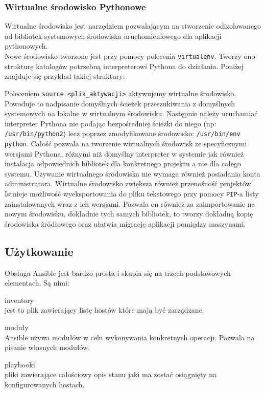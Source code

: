 \subsubsection{Wirtualne środowisko Pythonowe}
Wirtualne środowisko jest narzędziem pozwalającym na stworzenie odizolowanego od bibliotek systemowych środowiska uruchomieniowego dla aplikacji pythonowych.\\
Nowe środowisko tworzone jest przy pomocy polecenia \texttt{virtualenv}.
Tworzy ono strukturę katalogów potrzebną interpreterowi Pythona do działania. Poniżej znajduje się przykład takiej struktury:

Poleceniem \texttt{source <plik\_aktywacji>} aktywujemy wirtualne środowisko.
Powoduje to nadpisanie domyślnych ścieżek przeszukiwania z domyślnych systemowych na lokalne w wirtualnym środowisku.
Następnie należy uruchamiać interpreter Pythona nie podając bezpośredniej ścieżki do niego (np: \texttt{/usr/bin/python2}) lecz poprzez zmodyfikowane środowisko: \texttt{/usr/bin/env python}.
Całość pozwala na tworzenie wirtualnych środowisk ze specyficznymi wersjami Pythona, różnymi niż domyślny interpreter w systemie jak również instalacja odpowiednich bibliotek dla konkretnego projektu a nie dla całego systemu.
Używanie wirtualnego środowiska nie wymaga również posiadania konta administratora.  
Wirtualne środowisko zwiększa również przenośność projektów.
Istnieje możliwość wyeksportowania do pliku tekstowego przy pomocy \texttt{PIP}-a listy zainstalowanych wraz z ich wersjami.
Pozwala on również za zaimportowanie na nowym środowisku, dokładnie tych samych bibliotek, to tworzy dokładną kopię środowiska źródłowego oraz ułatwia migrację aplikacji pomiędzy maszynami.
\subsection{Użytkowanie}
Obsługa Ansible jest bardzo prosta i skupia się na trzech podstawowych elementach. Są nimi:
\begin{description}
\item {inventory}\\jest to plik zawierający listę hostów które mają być zarządzane.
\item {moduły}\\Ansible używa modułów w celu wykonywania konkretnych operacji. Pozwala na pisanie własnych modułów.
\item {playbooki}\\pliki zawierające całościowy opis stanu jaki ma zostać osiągnięty na konfigurowanych hostach.
\end{description}

